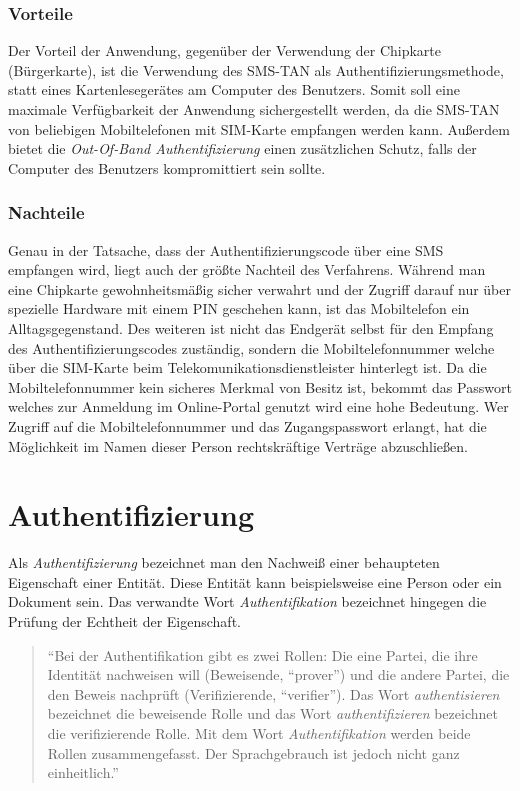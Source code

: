 \documentclass[11pt,a4paper,ngerman]{report}
\begin{document}
\subsubsection{Vorteile}
Der Vorteil der Anwendung, gegenüber der Verwendung der Chipkarte (Bürgerkarte), ist die Verwendung des SMS-TAN als Authentifizierungsmethode, statt eines Kartenlesegerätes am Computer des Benutzers. Somit soll eine maximale Verfügbarkeit der Anwendung sichergestellt werden, da die SMS-TAN von beliebigen Mobiltelefonen mit SIM-Karte empfangen werden kann. Außerdem bietet die \textit{Out-Of-Band Authentifizierung} einen zusätzlichen Schutz, falls der Computer des Benutzers kompromittiert sein sollte.
\subsubsection{Nachteile}
Genau in der Tatsache, dass der Authentifizierungscode über eine SMS empfangen wird, liegt auch der größte Nachteil des Verfahrens. Während man eine Chipkarte gewohnheitsmäßig sicher verwahrt und der Zugriff darauf nur über spezielle Hardware mit einem PIN geschehen kann, ist das Mobiltelefon ein Alltagsgegenstand. Des weiteren ist nicht das Endgerät selbst für den Empfang des Authentifizierungscodes zuständig, sondern die Mobiltelefonnummer welche über die SIM-Karte beim Telekomunikationsdienstleister hinterlegt ist. Da die Mobiltelefonnummer kein sicheres Merkmal von Besitz ist, bekommt das Passwort welches zur Anmeldung im Online-Portal genutzt wird eine hohe Bedeutung. Wer Zugriff auf die Mobiltelefonnummer und das Zugangspasswort erlangt, hat die Möglichkeit im Namen dieser Person rechtskräftige Verträge abzuschließen. 

\section{Authentifizierung}
Als \textit{Authentifizierung} bezeichnet man den Nachweiß einer behaupteten Eigenschaft einer Entität. Diese Entität kann beispielsweise eine Person oder ein Dokument sein. Das verwandte Wort \textit{Authentifikation} bezeichnet hingegen die Prüfung der Echtheit der Eigenschaft.
\begin{quote}
    ``Bei der Authentifikation gibt es zwei Rollen: Die eine Partei, die ihre Identität nachweisen will (Beweisende, ``prover'') und die andere Partei, die den Beweis nachprüft (Verifizierende, ``verifier''). Das Wort \textit{authentisieren} bezeichnet die beweisende Rolle und das Wort \textit{authentifizieren} bezeichnet die verifizierende Rolle. Mit dem Wort \textit{Authentifikation} werden beide Rollen zusammengefasst. Der Sprachgebrauch ist jedoch nicht ganz einheitlich.'' \cite[S. 149]{kryptSec11}
\end{quote}
\end{document}
